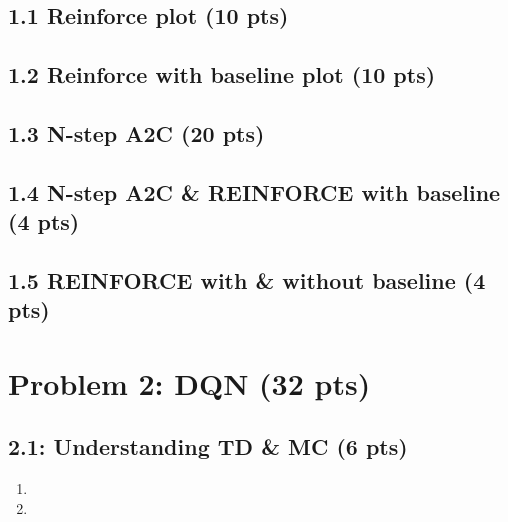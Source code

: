 \documentclass[12pt]{article}
\begin{document}
\subsection*{1.1 Reinforce plot (10 pts)}
\begin{solution}[height=9cm]
\end{solution}

\subsection*{1.2 Reinforce with baseline plot (10 pts)}
\begin{solution}[height=9cm]
\end{solution}

\subsection*{1.3 N-step A2C (20 pts)}
\begin{solution}[height=20cm]
\end{solution}

\subsection*{1.4 N-step A2C \& REINFORCE with baseline (4 pts)}
\begin{solution}[height=5cm]
\end{solution}

\subsection*{1.5 REINFORCE with \& without baseline (4 pts)}
\begin{solution}[height=5cm]
\end{solution}



\newpage
\section*{Problem 2: DQN (32 pts)}

\subsection*{2.1: Understanding TD \& MC (6 pts)}
\begin{solution}[height=6cm]
\begin{enumerate}
    \item 
    \item 
\end{enumerate}
\end{solution}
\end{document}
